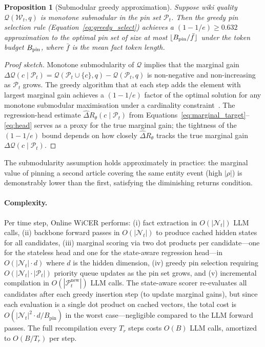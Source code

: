 \documentclass{article}
\newtheorem{proposition}[theorem]{Proposition}
\newcommand{\wt}{\mathcal{W}_t}
\newcommand{\nt}{\mathcal{N}_t}
\newcommand{\pt}{\mathcal{P}_t}
\begin{document}
\begin{proposition}[Submodular greedy approximation]
\label{prop:submodular}
Suppose wiki quality $\mathcal{Q}(\wt, q)$ is monotone submodular in the pin set $\pt$.
Then the greedy pin selection rule (Equation~\eqref{eq:greedy_select})
achieves a $(1-1/e) \geq 0.632$ approximation to the optimal pin set of size at most $\lfloor B_{\textup{pin}} / \bar{f} \rfloor$ under the token budget $B_{\textup{pin}}$, where $\bar{f}$ is the mean fact token length.
\end{proposition}
\begin{proof}[Proof sketch]
Monotone submodularity of $\mathcal{Q}$ implies that the marginal gain $\Delta\mathcal{Q}(c \mid \pt) = \mathcal{Q}(\pt \cup \{c\}, q) - \mathcal{Q}(\pt, q)$ is non-negative and non-increasing as $\pt$ grows.
The greedy algorithm that at each step adds the element with largest marginal gain achieves a $(1-1/e)$ factor of the optimal solution for any monotone submodular maximisation under a cardinality constraint~\citep{nemhauser1978analysis}.
The regression-head estimate $\hat{\Delta}R_\theta(c \mid \pt)$ from Equations~\eqref{eq:marginal_target}--\eqref{eq:head} serves as a proxy for the true marginal gain; the tightness of the $(1-1/e)$ bound depends on how closely $\hat{\Delta}R_\theta$ tracks the true marginal gain $\Delta\mathcal{Q}(c \mid \pt)$.
\end{proof}

The submodularity assumption holds approximately in practice: the marginal value of pinning a second article covering the same entity event (high $|\rho|$) is demonstrably lower than the first, satisfying the diminishing returns condition.

\paragraph{Complexity.}
Per time step, Online WiCER performs: (i) fact extraction in $O(|\nt|)$ LLM calls, (ii) backbone forward passes in $O(|\nt|)$ to produce cached hidden states for all candidates, (iii) marginal scoring via two dot products per candidate---one for the stateless head and one for the state-aware regression head---in $O(|\nt| \cdot d)$ where $d$ is the hidden dimension, (iv) greedy pin selection requiring $O(|\nt| \cdot |\pt|)$ priority queue updates as the pin set grows, and (v) incremental compilation in $O(|\pt^{\text{new}}|)$ LLM calls.
The state-aware scorer re-evaluates all candidates after each greedy insertion step (to update marginal gains), but since each evaluation is a single dot product on cached vectors, the total cost is $O(|\nt|^2 \cdot d / B_{\text{pin}})$ in the worst case---negligible compared to the LLM forward passes.
The full recompilation every $T_r$ steps costs $O(B)$ LLM calls, amortized to $O(B/T_r)$ per step.
\end{document}
